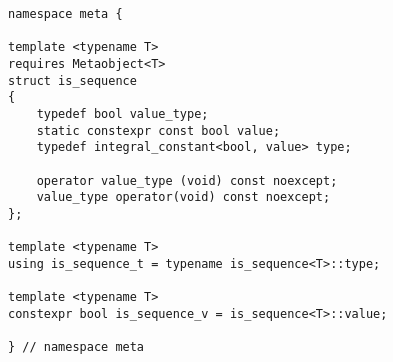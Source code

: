 
\begin{verbatim}
namespace meta {

template <typename T>
requires Metaobject<T>
struct is_sequence
{
	typedef bool value_type;
	static constexpr const bool value;
	typedef integral_constant<bool, value> type;

	operator value_type (void) const noexcept;
	value_type operator(void) const noexcept;
};

template <typename T>
using is_sequence_t = typename is_sequence<T>::type;

template <typename T>
constexpr bool is_sequence_v = is_sequence<T>::value;

} // namespace meta
\end{verbatim}
